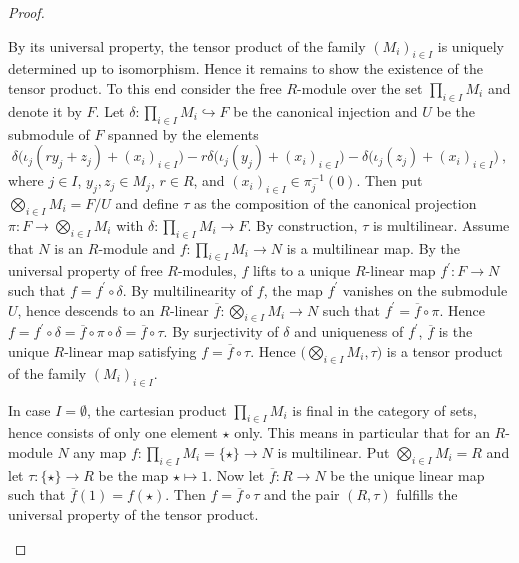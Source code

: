 \begin{proof}
\begin{adromanlist}
\item
  By its universal property, the tensor product of the family $(M_i)_{i\in I}$ is uniquely determined
  up to isomorphism. Hence it remains to show the existence of the tensor product.
  To this end consider the free $R$-module  %
  over the set $\prod_{i\in I}M_i$ and denote it by $F$. Let  $\delta: \prod_{i\in I}M_i \hookrightarrow F$ be
  the canonical injection  
  and $U$ be the submodule of $F$ spanned by the elements
  \[
    \delta \big( \iota_j (r y_j + z_j) + (x_i)_{i\in I} \big) - r \delta \big( \iota_j (y_j) + (x_i)_{i\in I}\big)
    - \delta \big( \iota_j (z_j) + (x_i)_{i\in I}\big) \ ,
  \]
  where $j\in I$, $y_j , z_j \in M_j$, $r \in R$,  and $(x_i)_{i\in I} \in \pi_j^{-1} (0)$. Then put
  $\bigotimes_{i\in I}M_i = F/U$ and define $\tau$ as the composition of the canonical projection
  $\pi : F \to \bigotimes_{i\in I}M_i$  with $\delta : \prod_{i\in I}M_i \to F$. By construction, $\tau$ is multilinear.
  Assume that $N$ is an $R$-module and $f : \prod_{i\in I}M_i \to N$ is a multilinear map. By the universal property of
  free $R$-modules, $f$ lifts to a unique $R$-linear map $f^\prime : F \to N$ such that $f = f^\prime \circ \delta$.
  By multilinearity of $f$, the map $f^\prime$ vanishes on the submodule $U$, hence descends to an $R$-linear
  $\overline{f}: \bigotimes_{i\in I}M_i \to N$ such that $f^\prime = \overline{f} \circ \pi$.
  Hence  $f = f^\prime \circ \delta = \overline{f} \circ \pi  \circ \delta  = \overline{f} \circ \tau$.
  By surjectivity of $\delta$ and uniqueness of $f^\prime$, $\overline{f}$ is the unique $R$-linear map satisfying
  $f = \overline{f} \circ \tau$. Hence $\big( \bigotimes_{i\in I}M_i,\tau\big)$ is a tensor product of the family
  $(M_i)_{i\in I}$.
  
  In case $I=\emptyset$, the cartesian product $\prod_{i\in I}M_i$ is final in the category of sets, hence 
  consists of only one element $\star$ only. This means in particular that 
  for an $R$-module $N$  any map $f: \prod_{i\in I}M_i = \{ \star\} \to N$ is multilinear. Put 
  $\bigotimes_{i\in I}M_i = R$ and let $\tau : \{ \star\} \to R$ be the map $\star \mapsto 1$. 
  Now let $\overline{f}: R \to N$ be the unique linear map such that $\overline{f}(1)= f(\star)$.
  Then $f = \overline{f}\circ \tau$ 
  and the pair $(R,\tau)$ fulfills the universal property of the tensor product. 
  

\end{adromanlist}
\end{proof}
